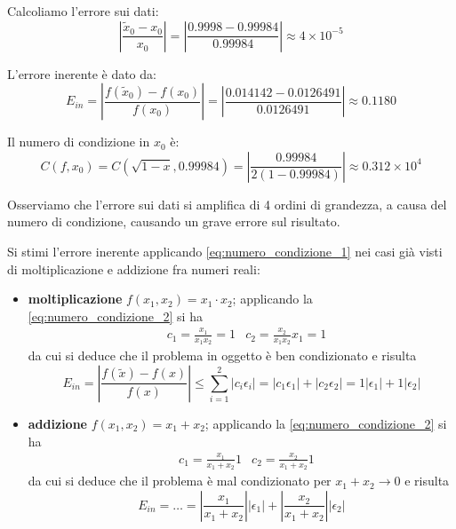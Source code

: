 \documentclass{article}
\begin{document}
\begin{example}
Calcoliamo l'errore sui dati:
$$\left\lvert\frac{\tilde{x}_0 - x_0}{x_0}\right\rvert =
\left\lvert\frac{0.9998 - 0.99984}{0.99984}\right\rvert \approx 4 \times 10^{-5}$$

L'errore inerente è dato da:
$$E_{in}=\left\lvert
\frac{f(\tilde{x}_0)-f(x_0)}{f(x_0)}\right\rvert=\left\lvert
\frac{0.014142-0.0126491}{0.0126491}\right\rvert\approx 0.1180$$

Il numero di condizione in $x_0$ è:
$$C(f, x_0) = C(\sqrt{1-x}, 0.99984) =
\left\lvert\frac{0.99984}{2(1-0.99984)}\right\rvert \approx 0.312 \times 10^4$$

Osserviamo che l'errore sui dati si amplifica di 4 ordini di grandezza, a causa
del numero di condizione, causando un grave errore sul risultato.
\end{example}
\begin{example}
    Si stimi l'errore inerente applicando \ref{eq:numero_condizione_1} nei casi già visti
   di moltiplicazione e addizione fra numeri reali:
   \begin{itemize}
       \item \textbf{moltiplicazione} $f(x_1,x_2)=x_1\cdot x_2$; applicando
           la \ref{eq:numero_condizione_2} si ha
           \begin{equation*}
                \begin{aligned}
                    & c_1=\frac{x_1}{x_1x_2}=1 & c_2=\frac{x_2}{x_1x_2}x_1=1
                \end{aligned} 
           \end{equation*}
           da cui si deduce che il problema in oggetto è ben condizionato e
           risulta 
           $$E_{in}=\left\lvert
           \frac{f(\tilde{x})-f(x)}{f(x)}\right\rvert\leq
           \displaystyle\sum_{i=1}^{2}\left\lvert
           c_i\epsilon_i\right\rvert=\left\lvert
           c_1\epsilon_1\right\rvert+\left\lvert
           c_2\epsilon_2\right\rvert=1 \left\lvert \epsilon_1\right\rvert+1
           \left\lvert \epsilon_2\right\rvert$$
       \item \textbf{addizione} $f(x_1,x_2)=x_1+x_2$; applicando la
           \ref{eq:numero_condizione_2} si ha
           \begin{equation*}
                \begin{aligned}
                    & c_1=\frac{x_1}{x_1+x_2}1 & c_2=\frac{x_2}{x_1+x_2}1
                \end{aligned} 
           \end{equation*}
           da cui si deduce che il problema è mal condizionato per
           $x_1+x_2\rightarrow0$ e risulta 
           $$E_{in}=\ldots=\left\lvert \frac{x_1}{x_1+x_2}\right\rvert
           \left\lvert \epsilon_1\right\rvert+ \left\lvert
           \frac{x_2}{x_1+x_2}\right\rvert \left\lvert \epsilon_2\right\rvert$$
   \end{itemize}
\end{example}
\end{document}
